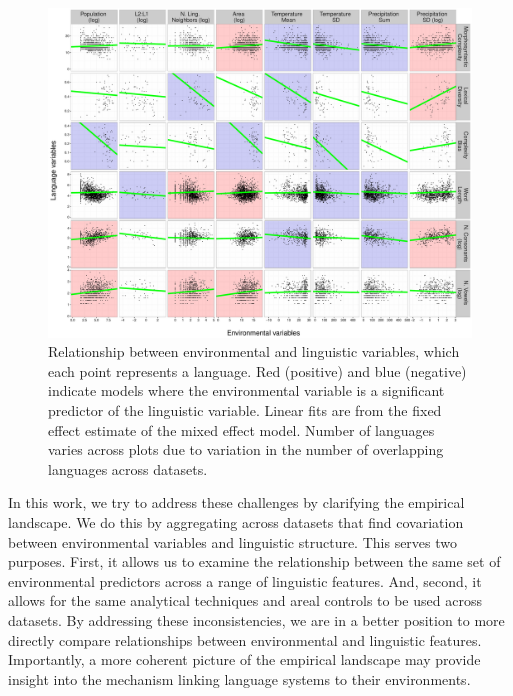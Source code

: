 \documentclass[10pt,letterpaper]{article}
\begin{document}
 \begin{figure}[t]
\begin{center}
\includegraphics[scale = .4]{figs/plot1.pdf}
\end{center}
\vspace{-.5em}
\caption{Relationship between environmental and linguistic variables, which each point represents a language. Red (positive) and blue (negative) indicate models where the environmental variable is a significant predictor of the linguistic variable. Linear fits are from the fixed effect estimate of the mixed effect model. Number of languages varies across plots due to variation in the number of overlapping languages across datasets.}
\label{fig:cbias}
\vspace{-1em}
\end{figure}

In this work, we try to address these challenges by clarifying the empirical landscape. We do this by aggregating across datasets that find covariation between environmental variables and linguistic structure. This serves two purposes. First, it allows us to examine the relationship between the same set of environmental predictors across a range of linguistic features. And, second, it allows for the same analytical techniques and areal controls to be used across datasets. By addressing these inconsistencies, we are in a better position to more directly compare relationships between environmental and linguistic features. Importantly, a more coherent picture of the empirical landscape may provide insight into the mechanism linking language systems to their environments.
\end{document}
